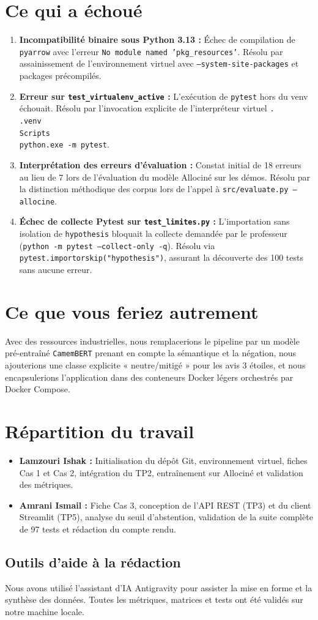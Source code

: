 \documentclass[11pt,a4paper]{article}
\begin{document}
\section{Ce qui a échoué}
\begin{enumerate}
    \item \textbf{Incompatibilité binaire sous Python 3.13 :} Échec de compilation de \texttt{pyarrow} avec l'erreur \texttt{No module named 'pkg\_resources'}. Résolu par assainissement de l'environnement virtuel avec \texttt{--system-site-packages} et packages précompilés.
    \item \textbf{Erreur sur \texttt{test\_virtualenv\_active} :} L'exécution de \texttt{pytest} hors du venv échouait. Résolu par l'invocation explicite de l'interpréteur virtuel \texttt{.\\.venv\\Scripts\\python.exe -m pytest}.
    \item \textbf{Interprétation des erreurs d'évaluation :} Constat initial de 18 erreurs au lieu de 7 lors de l'évaluation du modèle Allociné sur les démos. Résolu par la distinction méthodique des corpus lors de l'appel à \texttt{src/evaluate.py --allocine}.
    \item \textbf{Échec de collecte Pytest sur \texttt{test\_limites.py} :} L'importation sans isolation de \texttt{hypothesis} bloquait la collecte demandée par le professeur (\texttt{python -m pytest --collect-only -q}). Résolu via \texttt{pytest.importorskip("hypothesis")}, assurant la découverte des 100 tests sans aucune erreur.
\end{enumerate}

\section{Ce que vous feriez autrement}
Avec des ressources industrielles, nous remplacerions le pipeline par un modèle pré-entraîné \texttt{CamemBERT} prenant en compte la sémantique et la négation, nous ajouterions une classe explicite « neutre/mitigé » pour les avis 3 étoiles, et nous encapsulerions l'application dans des conteneurs Docker légers orchestrés par Docker Compose.

\section{Répartition du travail}
\begin{itemize}
    \item \textbf{Lamzouri Ishak :} Initialisation du dépôt Git, environnement virtuel, fiches Cas 1 et Cas 2, intégration du TP2, entraînement sur Allociné et validation des métriques.
    \item \textbf{Amrani Ismail :} Fiche Cas 3, conception de l'API REST (TP3) et du client Streamlit (TP5), analyse du seuil d'abstention, validation de la suite complète de 97 tests et rédaction du compte rendu.
\end{itemize}

\subsection*{Outils d'aide à la rédaction}
Nous avons utilisé l'assistant d'IA Antigravity pour assister la mise en forme et la synthèse des données. Toutes les métriques, matrices et tests ont été validés sur notre machine locale.
\end{document}
